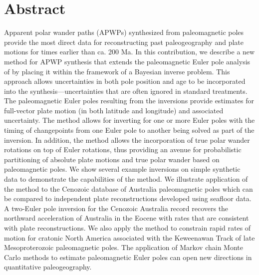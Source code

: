 \documentclass[11pt,letterpaper]{article}
\begin{document}
\section*{Abstract \label{sec:ABSTRACT}}
Apparent polar wander paths (APWPs) synthesized from paleomagnetic poles provide the most direct data for reconstructing past paleogeography and plate motions for times earlier than ca. 200 Ma. In this contribution, we describe a new method for APWP synthesis that extends the paleomagnetic Euler pole analysis of \cite{Gordon1984a} by placing it within the framework of a Bayesian inverse problem. This approach allows uncertainties in both pole position and age to be incorporated into the synthesis---uncertainties that are often ignored in standard treatments. The paleomagnetic Euler poles resulting from the inversions provide estimates for full-vector plate motion (in both latitude and longitude) and associated uncertainty. The method allows for inverting for one or more Euler poles with the timing of changepoints from one Euler pole to another being solved as part of the inversion. In addition, the method allows the incorporation of true polar wander rotations on top of Euler rotations, thus providing an avenue for probabilistic partitioning of absolute plate motions and true polar wander based on paleomagnetic poles. We show several example inversions on simple synthetic data to demonstrate the capabilities of the method. We illustrate application of the method to the Cenozoic database of Australia paleomagnetic poles which can be compared to independent plate reconstructions developed using seafloor data. A two-Euler pole inversion for the Cenozoic Australia record recovers the northward acceleration of Australia in the Eocene with rates that are consistent with plate reconstructions. We also apply the method to constrain rapid rates of motion for cratonic North America associated with the Keweenawan Track of late Mesoproterozoic paleomagnetic poles. The application of Markov chain Monte Carlo methods to estimate paleomagnetic Euler poles can open new directions in quantitative paleogeography.
\end{document}

